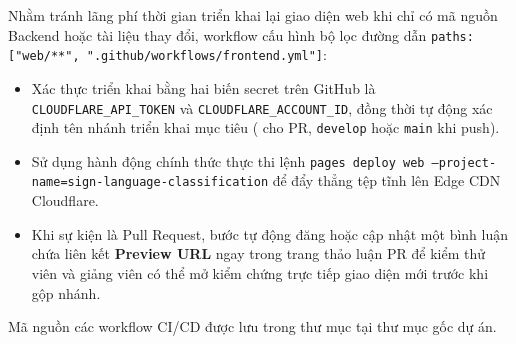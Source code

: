 Nhằm tránh lãng phí thời gian triển khai lại giao diện web khi chỉ có mã nguồn Backend hoặc tài liệu thay đổi, workflow  cấu hình bộ lọc đường dẫn \texttt{paths: ["web/**", ".github/workflows/frontend.yml"]}:
\begin{itemize}
    \item Xác thực triển khai bằng hai biến secret trên GitHub là \texttt{CLOUDFLARE\_\allowbreak API\_\allowbreak TOKEN} và \texttt{CLOUDFLARE\_\allowbreak ACCOUNT\_\allowbreak ID}, đồng thời tự động xác định tên nhánh triển khai mục tiêu ( cho PR, \texttt{develop} hoặc \texttt{main} khi push).
    \item Sử dụng hành động chính thức  thực thi lệnh \texttt{pages deploy web --project-name=sign-language-classification} để đẩy thẳng tệp tĩnh lên Edge CDN Cloudflare.
    \item Khi sự kiện là Pull Request, bước  tự động đăng hoặc cập nhật một bình luận chứa liên kết \textbf{Preview URL} ngay trong trang thảo luận PR để kiểm thử viên và giảng viên có thể mở kiểm chứng trực tiếp giao diện mới trước khi gộp nhánh.
\end{itemize}
Mã nguồn các workflow CI/CD được lưu trong thư mục  tại thư mục gốc dự án.
